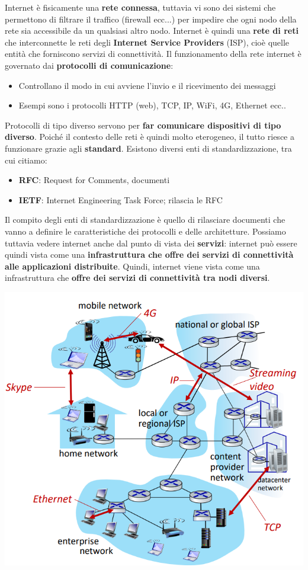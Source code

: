 \documentclass[12pt]{article}
\begin{document}
Internet è fisicamente una \textbf{rete connessa}, tuttavia vi sono dei sistemi che permettono di filtrare il traffico (firewall ecc...) per impedire che
ogni nodo della rete sia accessibile da un qualsiasi altro nodo. Internet è quindi una \textbf{rete di reti} che interconnette le reti
degli \textbf{Internet Service Providers} (ISP), cioè quelle entità che forniscono servizi di connettività. Il funzionamento della rete internet è governato
dai \textbf{protocolli di comunicazione}:
\begin{itemize}
    \item Controllano il modo in cui avviene l'invio e il ricevimento dei messaggi
    \item Esempi sono i protocolli HTTP (web), TCP, IP, WiFi, 4G, Ethernet ecc..
\end{itemize}
Protocolli di tipo diverso servono per \textbf{far comunicare dispositivi di tipo diverso}.
Poiché il contesto delle reti è quindi molto eterogeneo, il tutto riesce a funzionare grazie agli \textbf{standard}.
Esistono diversi enti di standardizzazione, tra cui citiamo:
\begin{itemize}
    \item \textbf{RFC}: Request for Comments, documenti
    \item \textbf{IETF}: Internet Engineering Task Force; rilascia le RFC
\end{itemize}
Il compito degli enti di standardizzazione è quello di rilasciare documenti che vanno a definire le caratteristiche
dei protocolli e delle architetture. Possiamo tuttavia vedere internet anche dal punto di vista dei \textbf{servizi}:
internet può essere quindi vista come una \textbf{infrastruttura che offre dei servizi di connettività alle applicazioni distribuite}.
Quindi, internet viene vista come una infrastruttura che \textbf{offre dei servizi di connettività tra nodi diversi}.
\begin{center}
    \includegraphics[width = 0.70\linewidth]{Images/2.PNG}
\end{center}
\end{document}

